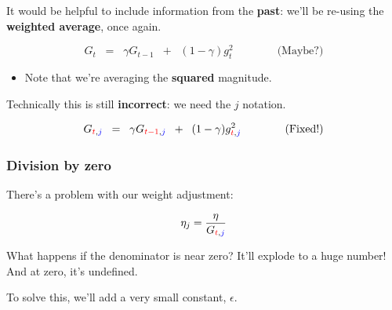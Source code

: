             It would be helpful to include information from the \textbf{past}: we'll be re-using the \textbf{weighted average}, once again.

            \begin{equation*}
                G_t \;\;=\;\; 
                \gamma G_{t-1} \;\;+\;\; 
                (1-\gamma) g_t^2 
                \qquad \qquad \text{(Maybe?)}
            \end{equation*}

            \begin{itemize}
                \item Note that we're averaging the \textbf{squared} magnitude.
            \end{itemize}
            
            Technically this is still \textbf{incorrect}: we need the $j$ notation.

            \begin{equation*}
                G_{\textcolor{red}{t},\textcolor{blue}{j}} \;\;=\;\; 
                \gamma G_{\textcolor{red}{t-1},\textcolor{blue}{j}} \;\;+\;\; 
                (1-\gamma) g_{\textcolor{red}{t},\textcolor{blue}{j}}^2 \qquad \qquad 
                \text{(Fixed!)}
            \end{equation*}

        \phantom{}

        \subsubsection{Division by zero}

            There's a problem with our weight adjustment:

            \begin{equation}
                \eta_j = \frac{\eta}{G_{\textcolor{red}{t},\textcolor{blue}{j}}}
            \end{equation}

            What happens if the denominator is near zero? It'll explode to a huge number! And at zero, it's undefined.

            To solve this, we'll add a very small constant, $\epsilon$.

